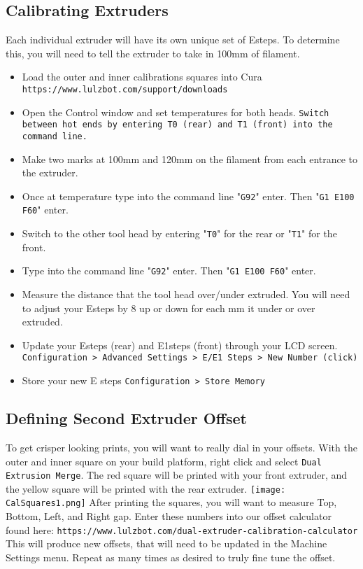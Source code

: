 \subsection{Calibrating Extruders}
Each individual extruder will have its own unique set of Esteps. To determine this, you will need to tell the extruder to take in 100mm of filament.
\begin{itemize}
\item Load the outer and inner calibrations squares into Cura \texttt{https://www.lulzbot.com/support/downloads}
\item Open the Control window and set temperatures for both heads. \texttt{Switch between hot ends by entering T0 (rear) and T1 (front) into the command line.}
\item Make two marks at 100mm and 120mm on the filament from each entrance to the extruder.
\item Once at temperature type into the command line "\texttt{G92}" enter. Then "\texttt{G1 E100 F60}" enter.
\item Switch to the other tool head by entering "\texttt{T0}" for the rear or "\texttt{T1}" for the front. 
\item Type into the command line "\texttt{G92}" enter. Then "\texttt{G1 E100 F60}" enter.
\item Measure the distance that the tool head over/under extruded. You will need to adjust your Esteps by 8 up or down for each mm it under or over extruded.
\item Update your Esteps (rear) and E1steps (front) through your LCD screen. \texttt{Configuration > Advanced Settings > E/E1 Steps > New Number (click)}
\item Store your new E steps \texttt{Configuration > Store Memory}
\end{itemize}

\subsection{Defining Second Extruder Offset}
To get crisper looking prints, you will want to really dial in your offsets. With the outer and inner square on your build platform, right click and select \texttt{Dual Extrusion Merge}. The red square will be printed with your front extruder, and the yellow square will be printed with the rear extruder.
\texttt{[image: CalSquares1.png]}
After printing the squares, you will want to measure Top, Bottom, Left, and Right gap. Enter these numbers into our offset calculator found here: \texttt{https://www.lulzbot.com/dual-extruder-calibration-calculator} This will produce new offsets, that will need to be updated in the Machine Settings menu. Repeat as many times as desired to truly fine tune the offset. 

